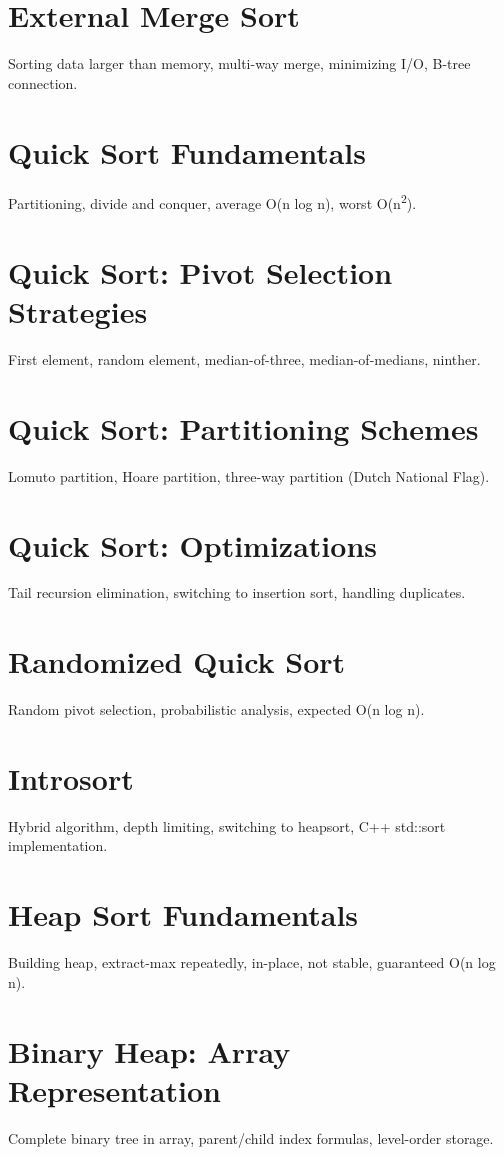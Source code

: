 \chapter{External Merge Sort}
Sorting data larger than memory, multi-way merge, minimizing I/O, B-tree connection.

\chapter{Quick Sort Fundamentals}
Partitioning, divide and conquer, average O(n log n), worst O(n\textsuperscript{2}).

\chapter{Quick Sort: Pivot Selection Strategies}
First element, random element, median-of-three, median-of-medians, ninther.

\chapter{Quick Sort: Partitioning Schemes}
Lomuto partition, Hoare partition, three-way partition (Dutch National Flag).

\chapter{Quick Sort: Optimizations}
Tail recursion elimination, switching to insertion sort, handling duplicates.

\chapter{Randomized Quick Sort}
Random pivot selection, probabilistic analysis, expected O(n log n).

\chapter{Introsort}
Hybrid algorithm, depth limiting, switching to heapsort, C++ std::sort implementation.

\chapter{Heap Sort Fundamentals}
Building heap, extract-max repeatedly, in-place, not stable, guaranteed O(n log n).

\chapter{Binary Heap: Array Representation}
Complete binary tree in array, parent/child index formulas, level-order storage.

